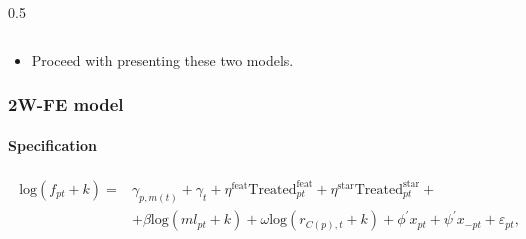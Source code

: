 \documentclass[8pt]{beamer}
\begin{document}
\begin{frame}
\begin{columns}[T]
\begin{column}{0.5\textwidth}
\begin{itemize}
\end{itemize}
\end{column}

\end{columns}
\vspace{1cm}
\begin{itemize}
    \item[$\rightarrow$] Proceed with presenting these two models.
\end{itemize}
\end{frame}


\begin{frame}[label=shortversion]

\frametitle{2W-FE model}
\framesubtitle{Specification}

\begin{align} 
    \begin{split} 
    \text{log}(f_{pt}+k) =
    & \gamma_{p,m(t)} + \gamma_t + \eta^{\text{feat}} \text{Treated}_{pt}^{\text{feat}} + \eta^{\text{star}} \text{Treated}_{pt}^{\text{star}} + \\ & + \beta \text{log}(ml_{pt}+k) + \omega \text{log}(r_{C(p),t}+k) + \phi^{\prime} x_{pt} + \psi^{\prime} x_{-pt} + \varepsilon_{pt}, 
    \end{split}
    \label{two_way_model}
\end{align} 



\end{frame}
\end{document}
